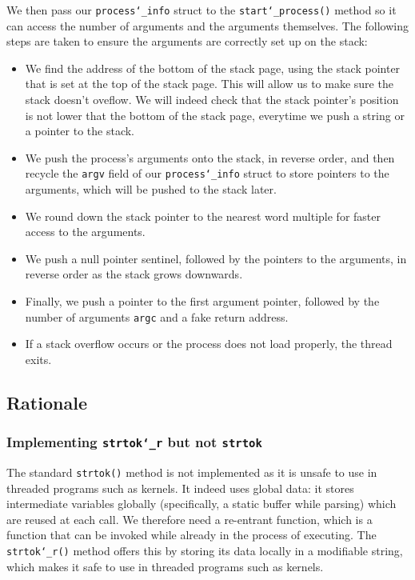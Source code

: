 \documentclass{article}
\renewcommand{\_}{\char`_}
\begin{document}
We then pass our \texttt{process\_info} struct to the \texttt{start\_process()} method so it can access the number of arguments and the arguments themselves. The following steps are taken to ensure the arguments are correctly set up on the stack:

\begin{itemize}

\item We find the address of the bottom of the stack page, using the stack pointer that is set at the top of the stack page. This will allow us to make sure the stack doesn't oveflow. We will indeed check that the stack pointer's position is not lower that the bottom of the stack page, everytime we push a string or a pointer to the stack.
\item We push the process's arguments onto the stack, in reverse order, and then recycle the \texttt{argv} field of our \texttt{process\_info} struct to store pointers to the arguments, which will be pushed to the stack later.
\item We round down the stack pointer to the nearest word multiple for faster access to the arguments.
\item We push a null pointer sentinel, followed by the pointers to the arguments, in reverse order as the stack grows downwards. 
\item Finally, we push a pointer to the first argument pointer, followed by the number of arguments \texttt{argc} and a fake return address.
\item If a stack overflow occurs or the process does not load properly, the thread exits.

\end{itemize}


\subsection{Rationale}

\subsubsection{Implementing \texttt{strtok\_r} but not \texttt{strtok}}

The standard \texttt{strtok()} method is not implemented as it is unsafe to use in threaded programs such as kernels. It indeed uses global data: it stores intermediate variables globally (specifically, a static buffer while parsing) which are reused at each call. We therefore need a re-entrant function, which is a function that can be invoked while already in the process of executing. The \texttt{strtok\_r()} method offers this by storing its data locally in a modifiable string, which makes it safe to use in threaded programs such as kernels.
\end{document}
